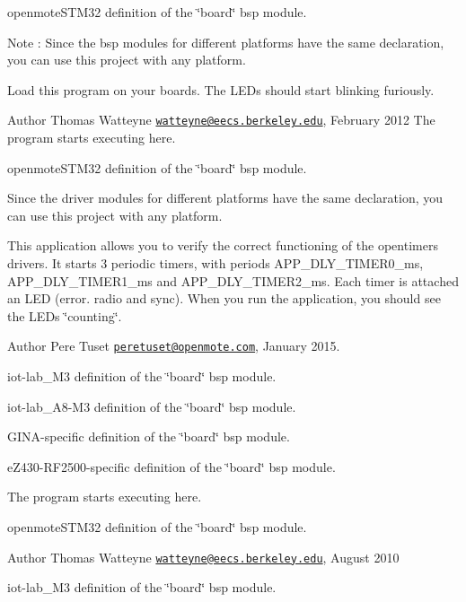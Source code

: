 openmote\+S\+T\+M32 definition of the \char`\"{}board\char`\"{} bsp module.

\begin{DoxyNote}{Note}
\+: Since the bsp modules for different platforms have the same declaration, you can use this project with any platform.
\end{DoxyNote}
Load this program on your boards. The L\+E\+Ds should start blinking furiously.

\begin{DoxyAuthor}{Author}
Thomas Watteyne \href{mailto:watteyne@eecs.berkeley.edu}{\tt watteyne@eecs.\+berkeley.\+edu}, February 2012 The program starts executing here.
\end{DoxyAuthor}
openmote\+S\+T\+M32 definition of the \char`\"{}board\char`\"{} bsp module.

Since the driver modules for different platforms have the same declaration, you can use this project with any platform.

This application allows you to verify the correct functioning of the opentimers drivers. It starts 3 periodic timers, with periods A\+P\+P\+\_\+\+D\+L\+Y\+\_\+\+T\+I\+M\+E\+R0\+\_\+ms, A\+P\+P\+\_\+\+D\+L\+Y\+\_\+\+T\+I\+M\+E\+R1\+\_\+ms and A\+P\+P\+\_\+\+D\+L\+Y\+\_\+\+T\+I\+M\+E\+R2\+\_\+ms. Each timer is attached an L\+ED (error. radio and sync). When you run the application, you should see the L\+E\+Ds \char`\"{}counting\char`\"{}.

\begin{DoxyAuthor}{Author}
Pere Tuset \href{mailto:peretuset@openmote.com}{\tt peretuset@openmote.\+com}, January 2015.
\end{DoxyAuthor}
iot-\/lab\+\_\+\+M3 definition of the \char`\"{}board\char`\"{} bsp module.

iot-\/lab\+\_\+\+A8-\/\+M3 definition of the \char`\"{}board\char`\"{} bsp module.

G\+I\+N\+A-\/specific definition of the \char`\"{}board\char`\"{} bsp module.

e\+Z430-\/\+R\+F2500-\/specific definition of the \char`\"{}board\char`\"{} bsp module.

The program starts executing here.

openmote\+S\+T\+M32 definition of the \char`\"{}board\char`\"{} bsp module.

\begin{DoxyAuthor}{Author}
Thomas Watteyne \href{mailto:watteyne@eecs.berkeley.edu}{\tt watteyne@eecs.\+berkeley.\+edu}, August 2010
\end{DoxyAuthor}
iot-\/lab\+\_\+\+M3 definition of the \char`\"{}board\char`\"{} bsp module.

